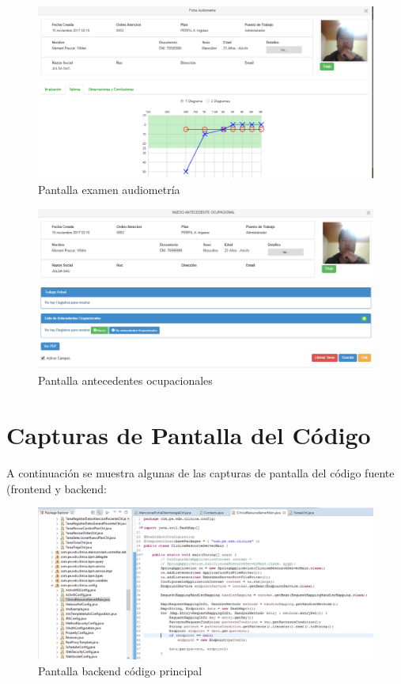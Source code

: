 			\begin{figure}[H]
			    \centering
				\includegraphics[width=18cm]{../imgs/ui/audiometria.png}
				\caption{Pantalla examen audiometría}
				\label{figure:audiometria}
			\end{figure}
			
			\begin{figure}[H]
			    \centering
				\includegraphics[width=18cm]{../imgs/ui/ocupacional.png}
				\caption{Pantalla antecedentes ocupacionales}
				\label{figure:ocupacional}
			\end{figure}
			
			
			
		\section{Capturas de Pantalla del Código}
			A continuación se muestra algunas de las capturas de pantalla del código
			fuente (frontend y backend:
			
			\begin{figure}[H]
			    \centering
				\includegraphics[width=18cm]{../imgs/codigo/back-main.png}
				\caption{Pantalla backend código principal}
				\label{figure:back-main}
			\end{figure}
			
